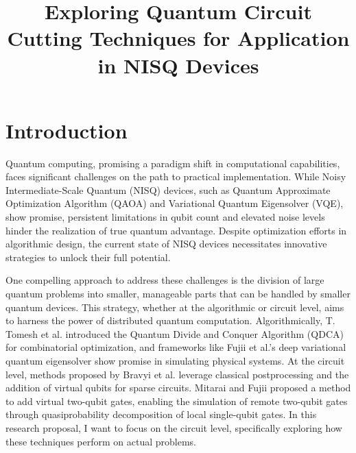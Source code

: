 \documentclass[]{article}
\title{Exploring Quantum Circuit Cutting Techniques for Application in NISQ Devices}
\author{}
\date{}
\begin{document}
\maketitle

\section{Introduction}

Quantum computing, promising a paradigm shift in computational capabilities, faces significant challenges on the path to practical implementation. While Noisy Intermediate-Scale Quantum (NISQ) devices, such as Quantum Approximate Optimization Algorithm (QAOA)\cite{OA1} and Variational Quantum Eigensolver (VQE)\cite{VQE1, VQE2}, show promise, persistent limitations in qubit count and elevated noise levels hinder the realization of true quantum advantage. Despite optimization efforts in algorithmic design, the current state of NISQ devices necessitates innovative strategies to unlock their full potential\cite{In1, In2}.

One compelling approach to address these challenges is the division of large quantum problems into smaller, manageable parts that can be handled by smaller quantum devices. This strategy, whether at the algorithmic or circuit level, aims to harness the power of distributed quantum computation. Algorithmically, T. Tomesh et al. introduced the Quantum Divide and Conquer Algorithm (QDCA) for combinatorial optimization\cite{QDCA}, and frameworks like Fujii et al.'s deep variational quantum eigensolver show promise in simulating physical systems\cite{fujii2022deep}. At the circuit level, methods proposed by Bravyi et al. leverage classical postprocessing and the addition of virtual qubits for sparse circuits\cite{PhysRevX.6.021043}. Mitarai and Fujii proposed a method to add virtual two-qubit gates, enabling the simulation of remote two-qubit gates through quasiprobability decomposition of local single-qubit gates\cite{Mitarai_2021}. In this research proposal, I want to focus on the circuit level, specifically exploring how these techniques perform on actual problems.
\end{document}
